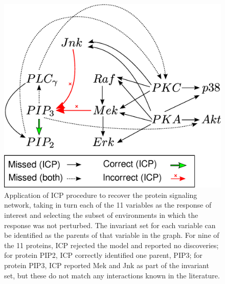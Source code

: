 \documentclass{article}
\begin{document}
\begin{figure}[t]
\centering
\includegraphics[scale = 0.3]{drawing2legend.eps}
\caption{\small Application of ICP procedure to recover the protein signaling network,
taking in turn each of the 11 variables as the response of interest
and selecting the subset of environments in which the response was not
perturbed.  The invariant set for each variable can be identified as
the parents of that variable in the graph.  For nine of the 11 proteins,
ICP rejected the model and reported no discoveries;  for protein
PIP2, ICP correctly identified one parent, PIP3; for protein
PIP3, ICP reported Mek and Jnk as part of the invariant set, but these
do not match any interactions known in the literature.}
\label{fig:sachs}
\end{figure}




\end{document}

